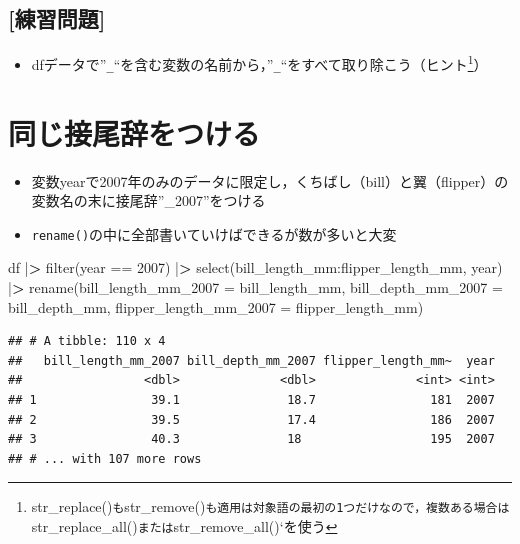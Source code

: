 \documentclass[
  xelatex,ja=standard, b5paper]{bxjsbook}
\newenvironment{Shaded}{\begin{snugshade}}{\end{snugshade}}
\newcommand{\AttributeTok}[1]{\textcolor[rgb]{0.77,0.63,0.00}{#1}}
\newcommand{\DecValTok}[1]{\textcolor[rgb]{0.00,0.00,0.81}{#1}}
\newcommand{\ErrorTok}[1]{\textcolor[rgb]{0.64,0.00,0.00}{\textbf{#1}}}
\newcommand{\FunctionTok}[1]{\textcolor[rgb]{0.00,0.00,0.00}{#1}}
\newcommand{\NormalTok}[1]{#1}
\newcommand{\SpecialCharTok}[1]{\textcolor[rgb]{0.00,0.00,0.00}{#1}}
\providecommand{\tightlist}{%
  \setlength{\itemsep}{0pt}\setlength{\parskip}{0pt}}
\begin{document}
\hypertarget{ux7df4ux7fd2ux554fux984c-4}{%
\subsection{{[}練習問題{]}}\label{ux7df4ux7fd2ux554fux984c-4}}

\begin{itemize}
\tightlist
\item
  dfデータで''\texttt{\_}``を含む変数の名前から，''\texttt{\_}``をすべて取り除こう（ヒント\footnote{str\_replace()\texttt{も}str\_remove()\texttt{も適用は対象語の最初の1つだけなので，複数ある場合は}str\_replace\_all()\texttt{または}str\_remove\_all()`を使う}）
\end{itemize}

\hypertarget{rename-add}{%
\section{同じ接尾辞をつける}\label{rename-add}}

\begin{itemize}
\tightlist
\item
  変数yearで2007年のみのデータに限定し，くちばし（bill）と翼（flipper）の変数名の末に接尾辞''\_2007''をつける
\item
  \texttt{rename()}の中に全部書いていけばできるが数が多いと大変
\end{itemize}

\begin{Shaded}
\begin{Highlighting}[]
\NormalTok{df }\SpecialCharTok{|}\ErrorTok{\textgreater{}} 
  \FunctionTok{filter}\NormalTok{(year }\SpecialCharTok{==} \DecValTok{2007}\NormalTok{) }\SpecialCharTok{|}\ErrorTok{\textgreater{}} 
  \FunctionTok{select}\NormalTok{(bill\_length\_mm}\SpecialCharTok{:}\NormalTok{flipper\_length\_mm, year) }\SpecialCharTok{|}\ErrorTok{\textgreater{}} 
  \FunctionTok{rename}\NormalTok{(}\AttributeTok{bill\_length\_mm\_2007 =}\NormalTok{ bill\_length\_mm,}
         \AttributeTok{bill\_depth\_mm\_2007  =}\NormalTok{ bill\_depth\_mm,}
         \AttributeTok{flipper\_length\_mm\_2007 =}\NormalTok{ flipper\_length\_mm)}
\end{Highlighting}
\end{Shaded}

\begin{verbatim}
## # A tibble: 110 x 4
##   bill_length_mm_2007 bill_depth_mm_2007 flipper_length_mm~  year
##                 <dbl>              <dbl>              <int> <int>
## 1                39.1               18.7                181  2007
## 2                39.5               17.4                186  2007
## 3                40.3               18                  195  2007
## # ... with 107 more rows
\end{verbatim}
\end{document}
